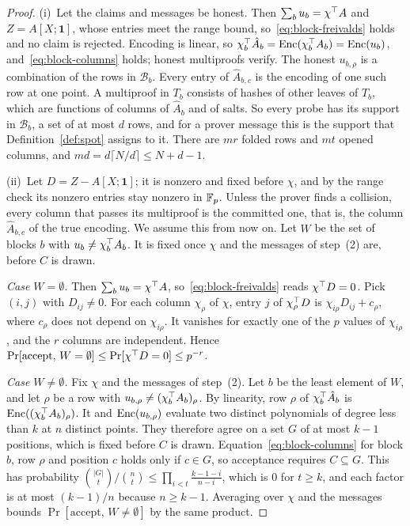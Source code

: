 \begin{proof}
(i)~Let the claims and messages be honest. Then $\sum_bu_b=\chi^\top A$ and $Z=A[X;\mathbf 1]$, whose
entries meet the range bound, so~\eqref{eq:block-freivalds} holds and no claim is rejected. Encoding
is linear, so $\chi_b^\top\hat A_b=\mathrm{Enc}(\chi_b^\top A_b)=\mathrm{Enc}(u_b)$, and~\eqref{eq:block-columns} holds;
honest multiproofs verify. The honest $u_{b,\rho}$ is a combination of the rows in $\mathcal B_b$.
Every entry of $\hat A_{b,c}$ is the encoding of one such row at one point. A multiproof in $T_b$
consists of hashes of other leaves of $T_b$, which are functions of columns of $\hat A_b$ and of
salts. So every probe has its support in $\mathcal B_b$, a set of at most $d$ rows, and for a prover
message this is the support that Definition~\ref{def:spot} assigns to it. There are $mr$ folded rows
and $mt$ opened columns, and $md=d\lceil N/d\rceil\le N+d-1$.

(ii)~Let $D=Z-A[X;\mathbf 1]$; it is nonzero and fixed before $\chi$, and by the range check its
nonzero entries stay nonzero in $\mathbb{F}_p$. Unless the prover finds a collision, every column that passes
its multiproof is the committed one, that is, the column $\hat A_{b,c}$ of the true encoding. We
assume this from now on. Let $W$ be the set of blocks $b$ with $u_b\neq\chi_b^\top A_b$. It is fixed
once $\chi$ and the messages of step~(2) are, before $C$ is drawn.

\emph{Case $W=\emptyset$.} Then $\sum_bu_b=\chi^\top A$, so~\eqref{eq:block-freivalds} reads
$\chi^\top D=0$. Pick $(i,j)$ with $D_{ij}\neq0$. For each column $\chi_\rho$ of $\chi$, entry $j$ of
$\chi_\rho^\top D$ is $\chi_{i\rho}D_{ij}+c_\rho$, where $c_\rho$ does not depend on $\chi_{i\rho}$. It
vanishes for exactly one of the $p$ values of $\chi_{i\rho}$, and the $r$ columns are independent.
Hence $\Pr[\text{accept},\,W=\emptyset]\le\Pr[\chi^\top D=0]\le p^{-r}$.

\emph{Case $W\neq\emptyset$.} Fix $\chi$ and the messages of step~(2). Let $b$ be the least element
of $W$, and let $\rho$ be a row with $u_{b,\rho}\neq(\chi_b^\top A_b)_\rho$. By linearity, row $\rho$ of
$\chi_b^\top\hat A_b$ is $\mathrm{Enc}((\chi_b^\top A_b)_\rho)$. It and $\mathrm{Enc}(u_{b,\rho})$ evaluate two distinct
polynomials of degree less than $k$ at $n$ distinct points. They therefore agree on a set $G$ of at
most $k-1$ positions, which is fixed before $C$ is drawn. Equation~\eqref{eq:block-columns} for block
$b$, row $\rho$ and position $c$ holds only if $c\in G$, so acceptance requires $C\subseteq G$. This
has probability $\binom{|G|}{t}/\binom nt\le\prod_{i<t}\frac{k-1-i}{n-i}$, which is $0$ for $t\ge k$,
and each factor is at most $(k-1)/n$ because $n\ge k-1$. Averaging over $\chi$ and the messages
bounds $\Pr[\text{accept},\,W\neq\emptyset]$ by the same product.


\end{proof}
